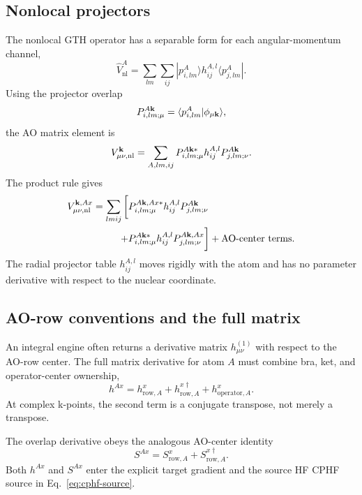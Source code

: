 \subsection{Nonlocal projectors}

The nonlocal GTH operator has a separable form for each angular-momentum
channel,
\begin{equation}
  \hat V_{\mathrm{nl}}^A
  =\sum_{l m}\sum_{ij}
   |p_{i,lm}^{A}\rangle h_{ij}^{A,l}
   \langle p_{j,lm}^{A}|.
  \label{eq:gth-nonlocal-operator}
\end{equation}
Using the projector overlap
\begin{equation}
  P_{i,lm;\mu}^{A\mathbf{k}}
  =\langle p_{i,lm}^{A}|\phi_{\mu\mathbf{k}}\rangle,
  \label{eq:gth-projector-overlap}
\end{equation}
the AO matrix element is
\begin{equation}
  V_{\mu\nu,\mathrm{nl}}^{\mathbf{k}}
  =\sum_{A,lm,ij}
   P_{i,lm;\mu}^{A\mathbf{k} *}h_{ij}^{A,l}
   P_{j,lm;\nu}^{A\mathbf{k}}.
  \label{eq:gth-nonlocal-matrix}
\end{equation}
The product rule gives
\begin{align}
  V_{\mu\nu,\mathrm{nl}}^{\mathbf{k},Ax}
  =\sum_{l m i j}
  \bigg[&P_{i,lm;\mu}^{A\mathbf{k},Ax *}h_{ij}^{A,l}
         P_{j,lm;\nu}^{A\mathbf{k}}
  \notag\\
       +&P_{i,lm;\mu}^{A\mathbf{k} *}h_{ij}^{A,l}
         P_{j,lm;\nu}^{A\mathbf{k},Ax}\bigg]
  +\text{AO-center terms}.
  \label{eq:gth-nonlocal-derivative}
\end{align}
The radial projector table $h_{ij}^{A,l}$ moves rigidly with the atom and has
no parameter derivative with respect to the nuclear coordinate.

\subsection{AO-row conventions and the full matrix}

An integral engine often returns a derivative matrix $h_{\mu\nu}^{(1)}$ with
respect to the AO-row center.  The full matrix derivative for atom $A$ must
combine bra, ket, and operator-center ownership,
\begin{equation}
  h^{Ax}=h_{\mathrm{row},A}^{x}
       +h_{\mathrm{row},A}^{x\dagger}
       +h_{\mathrm{operator},A}^{x}.
  \label{eq:hcore-full-derivative}
\end{equation}
At complex k-points, the second term is a conjugate transpose, not merely a
transpose.

The overlap derivative obeys the analogous AO-center identity
\begin{equation}
  S^{Ax}=S_{\mathrm{row},A}^{x}+S_{\mathrm{row},A}^{x\dagger}.
  \label{eq:overlap-full-derivative}
\end{equation}
Both $h^{Ax}$ and $S^{Ax}$ enter the explicit target gradient and the source
HF CPHF source in Eq.~\eqref{eq:cphf-source}.

